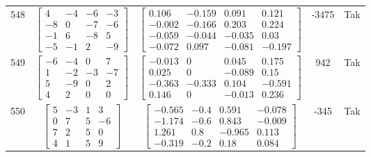 \documentclass[a4paper,12pt]{article}
\begin{document}
\begin{tabular}{c c c c c}
548
&
$\begin{bmatrix} 4 & -4 & -6 & -3 \\ -8 & 0 & -7 & -6 \\ -1 & 6 & -8 & 5 \\ -5 & -1 & 2 & -9 \end{bmatrix}$
&
$\begin{bmatrix} 0.106 & -0.159 & 0.091 & 0.121 \\ -0.002 & -0.166 & 0.203 & 0.224 \\ -0.059 & -0.044 & -0.035 & 0.03 \\ -0.072 & 0.097 & -0.081 & -0.197 \end{bmatrix}$
&
-3475
&
Tak
\\
549
&
$\begin{bmatrix} -6 & -4 & 0 & 7 \\ 1 & -2 & -3 & -7 \\ 5 & -9 & 0 & 2 \\ 4 & 2 & 0 & 0 \end{bmatrix}$
&
$\begin{bmatrix} -0.013 & 0 & 0.045 & 0.175 \\ 0.025 & 0 & -0.089 & 0.15 \\ -0.363 & -0.333 & 0.104 & -0.591 \\ 0.146 & 0 & -0.013 & 0.236 \end{bmatrix}$
&
942
&
Tak
\\
550
&
$\begin{bmatrix} 5 & -3 & 1 & 3 \\ 0 & 7 & 5 & -6 \\ 7 & 2 & 5 & 0 \\ 4 & 1 & 5 & 9 \end{bmatrix}$
&
$\begin{bmatrix} -0.565 & -0.4 & 0.591 & -0.078 \\ -1.174 & -0.6 & 0.843 & -0.009 \\ 1.261 & 0.8 & -0.965 & 0.113 \\ -0.319 & -0.2 & 0.18 & 0.084 \end{bmatrix}$
&
-345
&
Tak
\\
\end{tabular} \egroup \newpage
\end{document}
